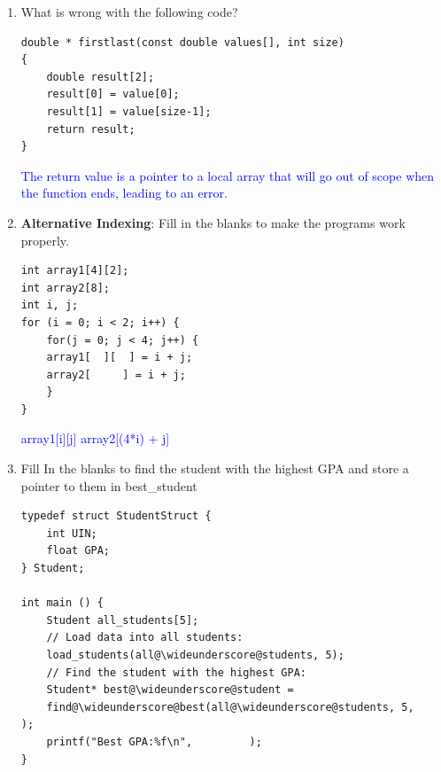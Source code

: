 \documentclass{article}
\begin{document}
\begin{enumerate}[label=(\alph*)]
\begin{lstlisting}[style=CStyle]
    if (start < end) {
        // Swap First and Last
        temp = array[start];
        array[start] = array[end];
        array[end] = temp;
        
        ReverseArray(array, size-1);
    }
}
int main(){
    int array[5], i;
    for (i = 0; i<5; i++){
        array[i] = i;
    }
    ReverseArray(array, 5);
    printf("Reversed Array: ");

    for (i = 0; i<5; i++){
        printf("%d ", array[i]);
    }
    printf("\n");
    return 0;
}\end{lstlisting}

\textcolor{blue}{The program is basically just flipping the first and last elements, and then flipping the first and second to last and so on. So in the end, the only thing that actually changes is the last element goes to the front and the rest is shifted up. To fix this we need to change the recursive call to ReverseArray(array+1, size-2)}

\item \textbf{}What is wrong with the following code? 
\begin{lstlisting}[style=CStyle] 
double * firstlast(const double values[], int size)
{
    double result[2];
    result[0] = value[0];
    result[1] = value[size-1];
    return result;
}
\end{lstlisting}
\textcolor{blue}{The return value is a pointer to a local array that will go out of scope when the function ends, leading to an error.}

\item \textbf{Alternative Indexing}: Fill in the blanks to make the programs work properly.
\begin{lstlisting}[style=CStyle] 
int array1[4][2];
int array2[8];
int i, j;
for (i = 0; i < 2; i++) {
    for(j = 0; j < 4; j++) {
    array1[  ][  ] = i + j;
    array2[     ] = i + j;
    }
}
\end{lstlisting}
\textcolor{blue}{array1[i][j] \newline array2[(4*i) + j]} %
\item Fill In the blanks to find the student with the highest GPA and store a pointer to them in best\_student
\begin{lstlisting}[style=CStyle] 
typedef struct StudentStruct {
    int UIN;
    float GPA;
} Student;

int main () {
    Student all_students[5];
    // Load data into all students:
    load_students(all@\wideunderscore@students, 5);
    // Find the student with the highest GPA:
    Student* best@\wideunderscore@student = 
    find@\wideunderscore@best(all@\wideunderscore@students, 5,         );
    printf("Best GPA:%f\n",         );
}


\end{lstlisting}
\end{enumerate}
\end{document}
